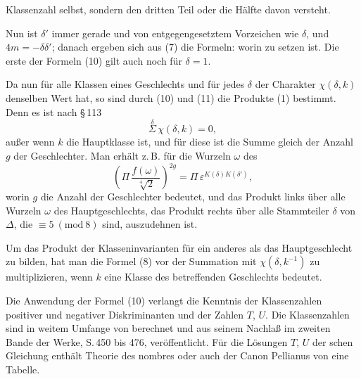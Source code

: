 Klassenzahl selbst, sondern den dritten Teil oder die Hälfte davon versteht.

Nun ist $\delta'$ immer gerade und von entgegengesetztem Vorzeichen wie $\delta$, und $4m=-\delta\delta'$; danach ergeben sich aus (7) die Formeln:
worin
zu setzen ist. Die erste der Formeln (10) gilt auch noch für $\delta=1$.

Da nun für alle Klassen eines Geschlechts und für jedes $\delta$ der Charakter $\chi(\delta,k)$ denselben Wert hat, so sind durch (10) und (11) die Produkte (1) bestimmt. Denn es ist nach \S\,113
\[
\overset{\delta}{\Sigma}\,\chi(\delta,k) = 0,
\]
außer wenn $k$ die Hauptklasse ist, und für diese ist die Summe gleich der Anzahl $g$ der Geschlechter. Man erhält z.\,B. für die Wurzeln $\omega$ des 
\[
\left(\Pi\,\frac{f(\omega)}{\sqrt[4]{2}}\right)^{2g} = \Pi\,\varepsilon^{K(\delta)K(\delta')},
\]
worin $g$ die Anzahl der Geschlechter bedeutet, und das Produkt links über alle Wurzeln $\omega$ des Hauptgeschlechts, das Produkt rechts über alle Stammteiler $\delta$ von $\Delta$, die $\equiv 5\ (\mathrm{mod}\ 8)$ sind, auszudehnen ist.

Um das Produkt der Klasseninvarianten für ein anderes als das Hauptgeschlecht zu bilden, hat man die Formel (8) vor der Summation mit $\chi(\delta,k^{-1})$ zu multiplizieren, wenn $k$ eine Klasse des betreffenden Geschlechts bedeutet.

Die Anwendung der Formel (10) verlangt die Kenntnis der Klassenzahlen positiver und negativer Diskriminanten und der Zahlen $T$, $U$. Die Klassenzahlen sind in weitem Umfange von  berechnet und aus seinem Nachlaß im zweiten Bande der Werke, S.\,450 bis 476, veröffentlicht. Für die Lösungen $T$, $U$ der schen Gleichung enthält  \glqq Theorie des nombres\grqq{} oder auch der \glqq Canon Pellianus\grqq{} von  eine Tabelle.
